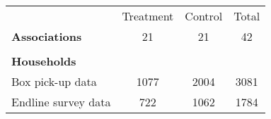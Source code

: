 \begin{adjustbox}{max width=\textwidth}
\begin{tabular}{lccc} \hline \hline
                                                                 & Treatment   &   Control   &   Total                  \\ 
                                                                 \cmidrule(lr){2-3}          \cmidrule(lr){4-4}    
\textbf{Associations}                    &21&21&42 \\ 
\\[-0.5em] 
\textbf{Households}                                                                                                                 \\ 
\hspace{2em} Box pick-up data    &1077&2004&3081 \\ 
\hspace{2em} Endline survey data &722&1062&1784 \\ 
\hline \hline \end{tabular}
\end{adjustbox}
